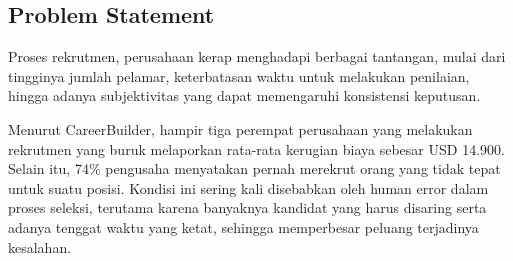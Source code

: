 



\subsection{Problem Statement}


Proses rekrutmen, perusahaan kerap menghadapi berbagai tantangan, mulai dari tingginya jumlah pelamar, keterbatasan waktu untuk melakukan penilaian, hingga adanya subjektivitas yang dapat memengaruhi konsistensi keputusan.

Menurut CareerBuilder, hampir tiga perempat perusahaan yang melakukan rekrutmen yang buruk melaporkan rata-rata kerugian biaya sebesar USD 14.900. Selain itu, 74\% pengusaha menyatakan pernah merekrut orang yang tidak tepat untuk suatu posisi. Kondisi ini sering kali disebabkan oleh human error dalam proses seleksi, terutama karena banyaknya kandidat yang harus disaring serta adanya tenggat waktu yang ketat, sehingga memperbesar peluang terjadinya kesalahan. \parencite{example2025}

